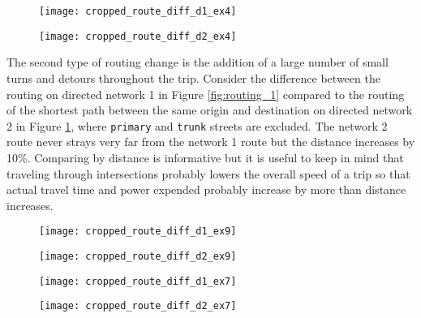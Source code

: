 \begin{figure}
\centering
\begin{minipage}{.5\textwidth}
  \centering
  \texttt{[image: cropped\_route\_diff\_d1\_ex4]}
  \label{fig:routing_1}
\end{minipage}%
\begin{minipage}{.5\textwidth}
  \centering
  \texttt{[image: cropped\_route\_diff\_d2\_ex4]}
  \label{fig:routing_2}
\end{minipage}
\end{figure}

The second type of routing change is the addition of a large number of small turns and detours throughout the trip. Consider the difference between the routing on directed network 1 in Figure \ref{fig:routing_1} compared to the routing of the shortest path between the same origin and destination on directed network 2 in Figure \ref{fig:routing_2}, where \texttt{primary} and \texttt{trunk} streets are excluded. The network 2 route never strays very far from the network 1 route but the distance increases by 10\%. Comparing by distance is informative but it is useful to keep in mind that traveling through intersections probably lowers the overall speed of a trip so that actual travel time and power expended probably increase by more than distance increases. 

\begin{figure}
\centering
\begin{minipage}{.5\textwidth}
  \centering
  \texttt{[image: cropped\_route\_diff\_d1\_ex9]}
  \label{fig:routing_3}
\end{minipage}%
\begin{minipage}{.5\textwidth}
  \centering
  \texttt{[image: cropped\_route\_diff\_d2\_ex9]}
  \label{fig:routing_4}
\end{minipage}
\end{figure}

\begin{figure}
\centering
\begin{minipage}{.5\textwidth}
  \centering
  \texttt{[image: cropped\_route\_diff\_d1\_ex7]}
  \label{fig:routing_5}
\end{minipage}%
\begin{minipage}{.5\textwidth}
  \centering
  \texttt{[image: cropped\_route\_diff\_d2\_ex7]}
  \label{fig:routing_6}
\end{minipage}
\end{figure}

